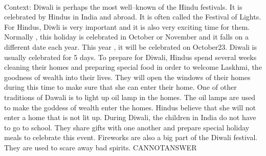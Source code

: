 \documentclass[11pt,a4paper, onecolumn]{article}
\begin{document}
\\ Context: Diwali is perhaps the most well--known of the Hindu festivals. It is celebrated by Hindus in India and abroad. It is often called the Festival of Lights. For Hindus, Diwli is very important and it is also very exciting time for them. Normally , this holiday is celebrated in October or November and it falls on a different date each year. This year , it will be celebrated on October23. Diwali is usually celebrated for 5 days. To prepare for Diwali, Hindus spend several weeks cleaning their homes and preparing special food in order to welcome Laskhmi, the goodness of wealth into their lives. They will open the windows of their homes during this time to make sure that she can enter their home. One of other traditions of Dawali is to light up oil lamp in the homes. The oil lamps are used to make the goddess of wealth enter the homes. Hindus believe that she will not enter a home that is not lit up. During Diwali, the children in India do not have to go to school. They share gifts with one another and prepare special holiday meals to celebrate this event. Fireworks are also a big part of the Diwali festival. They are used to scare away bad spirits. CANNOTANSWER
\end{document}
